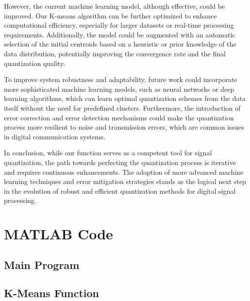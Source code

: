 \documentclass[11pt]{article}
\begin{document}
However, the current machine learning model, although effective, could be improved. Our K-means algorithm can be further optimized to enhance computational efficiency, especially for larger datasets or real-time processing requirements. Additionally, the model could be augmented with an automatic selection of the initial centroids based on a heuristic or prior knowledge of the data distribution, potentially improving the convergence rate and the final quantization quality.
\newline

To improve system robustness and adaptability, future work could incorporate more sophisticated machine learning models, such as neural networks or deep learning algorithms, which can learn optimal quantization schemes from the data itself without the need for predefined clusters. Furthermore, the introduction of error correction and error detection mechanisms could make the quantization process more resilient to noise and transmission errors, which are common issues in digital communication systems.
\newline

In conclusion, while our function serves as a competent tool for signal quantization, the path towards perfecting the quantization process is iterative and requires continuous enhancements. The adoption of more advanced machine learning techniques and error mitigation strategies stands as the logical next step in the evolution of robust and efficient quantization methods for digital signal processing.


\newpage
\section{MATLAB Code}
\subsection{Main Program}

\newpage
\subsection{K-Means Function}

\end{document}
